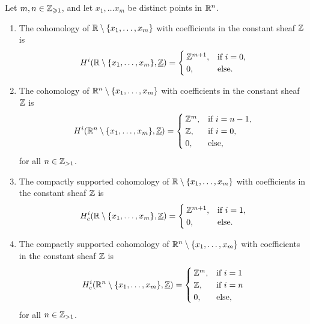 \begin{prop}[name=Cohomology of Euclidean space with missing points]
Let $m,n \in \mathbb{Z}_{\geqslant 1}$, and let $x_1, \ldots x_m$ be distinct points in $\mathbb{R}^n$. 
	\begin{enumerate}
        \item The cohomology of $\mathbb{R}\setminus\{x_1, \ldots, x_m\}$
        with coefficients in the constant sheaf $\mathbb{Z}$ is \[
    	     	\cohomology^i(\bb R\setminus\{x_1, \ldots, x_m\}, \underline{\bb Z}) = \begin{cases}
                \bb Z^{m+1}, & \text{if } i = 0,\\
                0, & \text{else}.
            \end{cases}
        \]
        \item The cohomology of $\mathbb{R}^n\setminus\{x_1, \ldots, x_m\}$ with coefficients in the constant sheaf $\mathbb{Z}$ is \[
        	\cohomology^i(\bb R^n\setminus\{x_1, \ldots, x_m\}, \underline{\bb Z}) = \begin{cases}
                \bb Z^m, & \text{if } i = n-1,\\
                \bb Z, & \text{if } i = 0,\\
                0, & \text{else},
            \end{cases}
        \] for all $n \in \mathbb{Z}_{> 1}$. 
        \item The compactly supported cohomology of $\mathbb{R}\setminus\{x_1, \ldots, x_m\}$
        with coefficients in the constant sheaf $\mathbb{Z}$ is \[
    	     	\cohomology^i_c(\bb R\setminus\{x_1, \ldots, x_m\}, \underline{\bb Z}) = \begin{cases}
                \bb Z^{m+1}, & \text{if } i = 1,\\
                0, & \text{else}.
            \end{cases}
        \]
    	\item The compactly supported cohomology of $\mathbb{R}^n\setminus \{x_1, \ldots, x_m\}$ with coefficients in the constant sheaf $\mathbb{Z}$ is \[
        	\cohomology^i_c(\bb R^n\setminus \{x_1, \ldots, x_m\}, \underline{\bb Z}) = \begin{cases}
                \bb Z^{m}, & \text{if } i = 1\\
                \bb Z, & \text{if } i = n \\
                0, &\text{else},
            \end{cases}
        \] for all $n \in \mathbb{Z}_{>1}$.
    \end{enumerate}
\end{prop}
